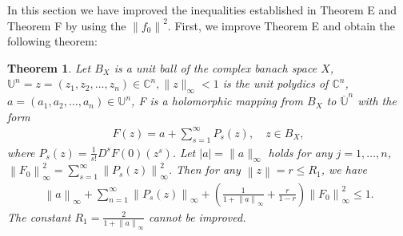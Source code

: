 \documentclass{birkjour}
\theoremstyle{plain}
\newtheorem{thm}{Theorem}
\theoremstyle{definition}
\theoremstyle{definition}
\begin{document}
In this section we have improved the inequalities established in Theorem E and Theorem F by using the $\left \| f_0 \right \| ^ 2$. First, we improve Theorem E and obtain the following theorem:
	\begin{thm}
	Let $B_X$ is a unit ball of the complex banach space $X$, $\mathbb{U}^n={z=(z_1,z_2,\dots,z_n)\in\mathbb{C}^n,\|z\|_\infty<1}$ is the unit polydics of $\mathbb{C}^n$, $a=(a_1,a_2,\dots,a_n)\in\mathbb{U}^n$, F is a holomorphic mapping from $B_X $ to $\overline {\mathbb{U}}^n$  with the form	
	\begin{align*}
		F(z)=a+\sum_{s=1}^{\infty} P_s(z),\quad z \in B_X,
	\end{align*}
	where $P_s(z)=\frac{1}{s!} D^sF(0)(z^s)$.
	Let $\left |a \right |=\| a \|_\infty$ holds for any $j=1,\dots ,n$, $\left \| F_0 \right \| ^2_\infty=\sum_{s=1}^{\infty}\left \| P_s(z) \right \|^2_\infty$. Then for any $\left \| z \right \|  =r \le R_1$, we have
	\begin{align}
		\left \| a \right \| _\infty +\sum_{n=1}^{\infty} \left \| P_s(z) \right \| _\infty+(\frac{1}{1+\left \| a \right \| _\infty} +\frac{r}{1-r} )\left \| F_0 \right \|^2_\infty \le 1.
	\end{align}
	The constant $R_1=\frac{2}{1+\left \| a \right \| _\infty}$ cannot be improved.
    \end{thm}
\end{document}
